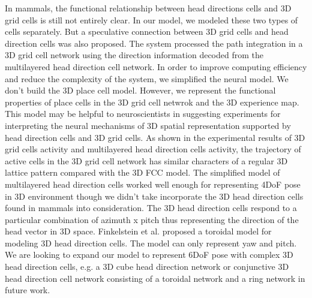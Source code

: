 In mammals, the functional relationship between head directions cells and 3D grid cells is still not entirely clear.
In our model, we modeled these two types of cells separately.
But a speculative connection between 3D grid cells and head direction cells was also proposed.
The system processed the path integration in a 3D grid cell network using the direction information decoded from the multilayered head direction cell network.
In order to improve computing efficiency and reduce the complexity of the system, we simplified the neural model.
We don't build the 3D place cell model.
However, we represent the functional properties of place cells in the 3D grid cell netwrok and the 3D experience map.
This model may be helpful to neuroscientists in suggesting experiments for interpreting the neural mechanisms of 3D spatial representation supported by head direction cells and 3D grid cells.
As shown in the experimental results of 3D grid cells activity and multilayered head direction cells activity, the trajectory of active cells in the 3D grid cell network has similar characters of a regular 3D lattice pattern compared with the 3D FCC model.
The simplified model of multilayered head direction cells worked well enough for representing 4DoF pose in 3D environment though we didn't take incorporate the 3D head direction cells found in mammals into consideration.
The 3D head direction cells respond to a particular combination of azimuth x pitch thus representing the direction of the head vector in 3D space.
Finkelstein et al. proposed a toroidal model for modeling 3D head direction cells.
The model can only represent yaw and pitch.
We are looking to expand our model to represent 6DoF pose with complex 3D head direction cells, e.g. a 3D cube head direction network or conjunctive 3D head direction cell network consisting of a toroidal network and a ring network in future work.


